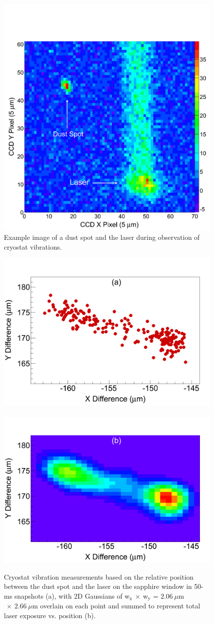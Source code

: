 \begin{figure} %
        \centering
                \includegraphics[width=.6\textwidth]{figures/image_dustspot.png}
                \caption{Example image of a dust spot and the laser during observation of cryostat vibrations.}
\label{fig:dustspot}
\end{figure}

\begin{figure} %
        \centering
                \includegraphics[width=.5\textwidth]{figures/cryovibes_a.png}
                ~
                \includegraphics[width=.5\textwidth]{figures/cryovibes_b.png}
                \caption{Cryostat vibration measurements based on the relative position between the dust spot and the laser on the sapphire window in 50-ms snapshots (a), with 2D Gaussians of w$_{\text{x}}~\times~$w$_{\text{y}}$ = $2.06~\mu$m$~\times~2.66~\mu$m overlain on each point and summed to represent total laser exposure vs. position (b).}
\label{fig:cryovibe2D}
\end{figure}


